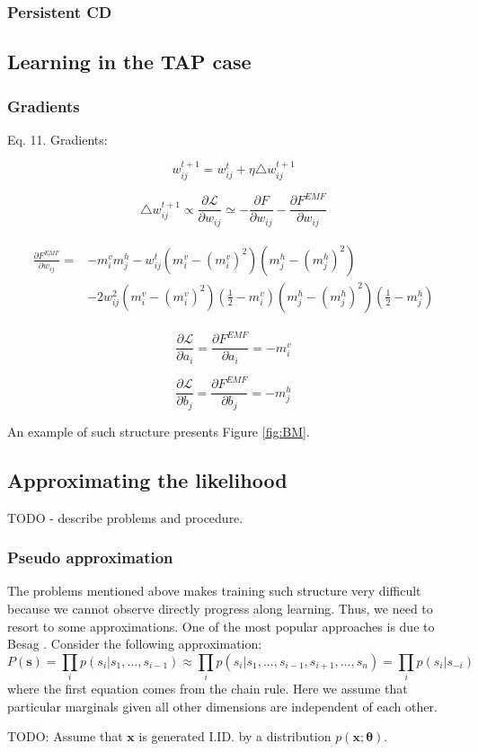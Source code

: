 \documentclass[../report/report.tex]{subfiles}
\begin{document}
 \subsubsection{Persistent CD}   
   \subsection{Learning in the TAP case}
    \subsubsection{Gradients}

Eq. 11. Gradients:

$$w_{ij}^{t+1} = w_{ij}^{t} + \eta \triangle w_{ij}^{t+1}$$

$$ \triangle w_{ij}^{t+1} \propto \frac{\partial \mathcal{L}}{\partial w_{ij}} \simeq -\frac{\partial F}{\partial w_{ij}} - \frac{\partial F^{EMF}}{\partial w_{ij}}$$

\begin{align*}
\begin{split}
\frac{\partial F^{EMF}}{\partial w_{ij}} = & -m_i^v m_j^h - w_{ij}^t(m_i^v - (m_i^v)^2)(m_j^h - (m_j^h)^2) \\
 & - 2w_{ij}^2 (m_i^v - (m_i^v)^2)(\frac{1}{2} - m_i^v)(m_j^h - (m_j^h)^2)(\frac{1}{2} - m_j^h)
\end{split}
\end{align*}

$$\frac{\partial \mathcal{L}}{\partial a_i} = \frac{\partial F^{EMF}}{\partial a_i} = -m_i^v$$

$$\frac{\partial \mathcal{L}}{\partial b_j} = \frac{\partial F^{EMF}}{\partial b_j} = -m_j^h$$

 
An example of such structure presents Figure \ref{fig:BM}.
\subsection{Approximating the likelihood}
TODO - describe problems and procedure.

\subsubsection{Pseudo approximation}
The problems mentioned above makes training such structure very difficult because we cannot observe directly progress along learning. Thus, we need to resort to some approximations. One of the most popular approaches is due to Besag \cite{besag1972nearest}.
Consider the following approximation:
\begin{equation}
P(\mathbf{s}) = \prod_i p(s_i| s_1,...,s_{i-1}) \approx \prod_i p(s_i | s_1, ..., s_{i-1}, s_{i+1},..., s_n) = \prod_i p(s_i| s_{-i})
\end{equation}
where the first equation comes from the chain rule. Here we assume that particular marginals given all other dimensions are independent of each other.
\begin{theorem}
TODO: Assume that $\mathbf{x}$ is generated I.ID. by a distribution $p(\mathbf{x};\mathbf{\theta})$.
\end{theorem}
	
\end{document}
